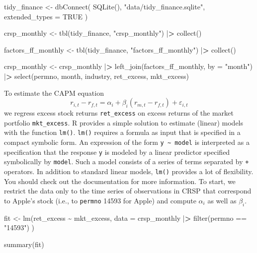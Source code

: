 \documentclass[
]{book}
\newenvironment{Shaded}{\begin{snugshade}}{\end{snugshade}}
\newcommand{\AttributeTok}[1]{\textcolor[rgb]{0.61,0.61,0.61}{#1}}
\newcommand{\ConstantTok}[1]{\textcolor[rgb]{0,0,0}{#1}}
\newcommand{\ErrorTok}[1]{\textcolor[rgb]{0.14,0.14,0.14}{\textbf{#1}}}
\newcommand{\FunctionTok}[1]{\textcolor[rgb]{0,0,0}{#1}}
\newcommand{\NormalTok}[1]{#1}
\newcommand{\OtherTok}[1]{\textcolor[rgb]{0.37,0.37,0.37}{#1}}
\newcommand{\SpecialCharTok}[1]{\textcolor[rgb]{0,0,0}{#1}}
\newcommand{\StringTok}[1]{\textcolor[rgb]{0.5,0.5,0.5}{#1}}
\begin{document}
\begin{Shaded}
\begin{Highlighting}[]
\NormalTok{tidy\_finance }\OtherTok{\textless{}{-}} \FunctionTok{dbConnect}\NormalTok{(}
  \FunctionTok{SQLite}\NormalTok{(), }\StringTok{"data/tidy\_finance.sqlite"}\NormalTok{, }\AttributeTok{extended\_types =} \ConstantTok{TRUE}
\NormalTok{)}

\NormalTok{crsp\_monthly }\OtherTok{\textless{}{-}} \FunctionTok{tbl}\NormalTok{(tidy\_finance, }\StringTok{"crsp\_monthly"}\NormalTok{) }\SpecialCharTok{|}\ErrorTok{\textgreater{}}
  \FunctionTok{collect}\NormalTok{()}

\NormalTok{factors\_ff\_monthly }\OtherTok{\textless{}{-}} \FunctionTok{tbl}\NormalTok{(tidy\_finance, }\StringTok{"factors\_ff\_monthly"}\NormalTok{) }\SpecialCharTok{|}\ErrorTok{\textgreater{}}
  \FunctionTok{collect}\NormalTok{()}

\NormalTok{crsp\_monthly }\OtherTok{\textless{}{-}}\NormalTok{ crsp\_monthly }\SpecialCharTok{|}\ErrorTok{\textgreater{}}
  \FunctionTok{left\_join}\NormalTok{(factors\_ff\_monthly, }\AttributeTok{by =} \StringTok{"month"}\NormalTok{) }\SpecialCharTok{|}\ErrorTok{\textgreater{}}
  \FunctionTok{select}\NormalTok{(permno, month, industry, ret\_excess, mkt\_excess)}
\end{Highlighting}
\end{Shaded}

To estimate the CAPM equation
\[
r_{i, t} - r_{f, t} = \alpha_i + \beta_i(r_{m, t}-r_{f,t})+\varepsilon_{i, t}
\]
we regress excess stock returns \texttt{ret\_excess} on excess returns of the market portfolio \texttt{mkt\_excess}.
R provides a simple solution to estimate (linear) models with the function \texttt{lm()}. \texttt{lm()} requires a formula as input that is specified in a compact symbolic form. An expression of the form \texttt{y\ \textasciitilde{}\ model} is interpreted as a specification that the response \texttt{y} is modeled by a linear predictor specified symbolically by \texttt{model}. Such a model consists of a series of terms separated by \texttt{+} operators. In addition to standard linear models, \texttt{lm()} provides a lot of flexibility. You should check out the documentation for more information. To start, we restrict the data only to the time series of observations in CRSP that correspond to Apple's stock (i.e., to \texttt{permno} 14593 for Apple) and compute \(\alpha_i\) as well as \(\beta_i\).

\begin{Shaded}
\begin{Highlighting}[]
\NormalTok{fit }\OtherTok{\textless{}{-}} \FunctionTok{lm}\NormalTok{(ret\_excess }\SpecialCharTok{\textasciitilde{}}\NormalTok{ mkt\_excess,}
  \AttributeTok{data =}\NormalTok{ crsp\_monthly }\SpecialCharTok{|}\ErrorTok{\textgreater{}}
    \FunctionTok{filter}\NormalTok{(permno }\SpecialCharTok{==} \StringTok{"14593"}\NormalTok{)}
\NormalTok{)}

\FunctionTok{summary}\NormalTok{(fit)}
\end{Highlighting}
\end{Shaded}
\end{document}
